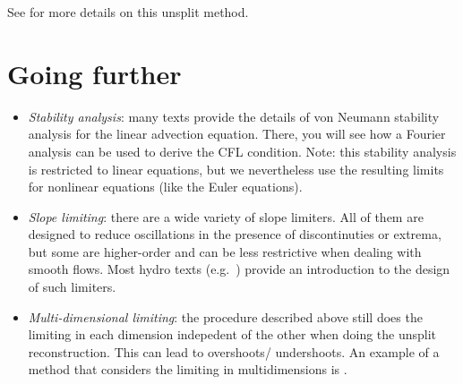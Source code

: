 \documentclass[11pt]{article}
\begin{document}
See \cite{colella:1990} for more details on this unsplit method.

\section{Going further}

\begin{itemize}
\item {\em Stability analysis}: many texts provide the details of von
  Neumann stability analysis for the linear advection equation.
  There, you will see how a Fourier analysis can be used to derive the
  CFL condition.  Note: this stability analysis is restricted to
  linear equations, but we nevertheless use the resulting limits for
  nonlinear equations (like the Euler equations).

\item {\em Slope limiting}: there are a wide variety of slope limiters.
  All of them are designed to reduce oscillations in the presence
  of discontinuties or extrema, but some are higher-order and can be
  less restrictive when dealing with smooth flows.  Most hydro
  texts (e.g.\ \cite{leveque:2002,toro:1997}) provide an introduction to the design
  of such limiters.

\item {\em Multi-dimensional limiting}: the procedure described above
  still does the limiting in each dimension indepedent of the other
  when doing the unsplit reconstruction.  This can lead to overshoots/
  undershoots.  An example of a method that considers the limiting
  in multidimensions is \cite{BDS,quadBDS}.

\end{itemize}




\end{document}
